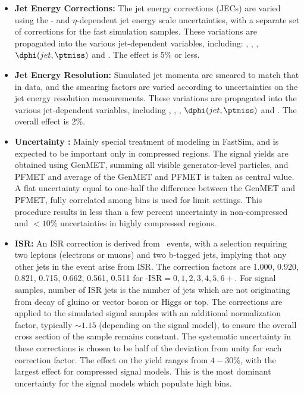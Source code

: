 \begin{itemize}
\item {\bf Jet Energy Corrections:} The jet energy corrections (JECs) are varied using the \pt-
and $\eta$-dependent jet energy scale uncertainties, with a separate set of corrections for the fast simulation samples.
These variations are propagated into the various jet-dependent variables, including: \nj, \nb, \ptmiss, $\dphi(jet,\ptmiss)$ and \ST.
The effect is 5\% or less.
\item {\bf Jet Energy Resolution:} Simulated jet momenta are smeared to match that in data, and the smearing factors are varied according to uncertainties on the jet energy resolution measurements. These variations are propagated into the various jet-dependent variables, including \nj, \nb, \ptmiss, $\dphi(jet,\ptmiss)$ and \ST. The overall effect is 2\%.
\item {\bf \ptmiss Uncertainty :} Mainly special treatment of \ptmiss modeling in FastSim, and is expected to be important only in compressed regions. The signal yields are obtained using GenMET, summing all visible generator-level particles, and PFMET and average of the GenMET and PFMET is taken as central value.  A flat uncertainty equal to one-half the difference between the GenMET and PFMET, fully correlated among \ptmiss bins is used for limit settings. This procedure results in less than a few percent uncertainty in non-compressed and $<10\%$ uncertainties in highly compressed regions.
\item {\bf ISR:} An ISR correction is derived from \ttbar\ events, with a selection requiring two leptons (electrons or muons) and two b-tagged jets, implying that any other jets in the event arise from ISR.
The correction factors are 1.000, 0.920, 0.821, 0.715, 0.662, 0.561, 0.511 for \nj-ISR$ = 0,1,2,3,4,5,6{+}$.
For signal samples, number of ISR jets is the number of jets which are not originating from decay of gluino or vector boson or Higgs or top.
The corrections are applied to the simulated signal samples with an additional normalization factor, typically ${\sim}1.15$ (depending on the signal model),
to ensure the overall cross section of the sample remains constant.
The systematic uncertainty in these corrections is chosen to be half of the deviation from unity for each correction factor.
The effect on the yield ranges from $4-30\%$, with the largest effect for compressed signal models. This is the most dominant uncertainty for the signal models which populate high \nj bins.
\end{itemize}

